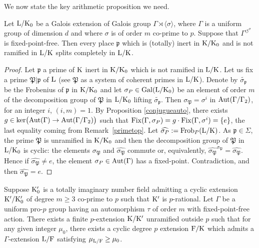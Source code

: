 \documentclass[12pt,a4paper,twoside,english]{smfart}
\def\K{{\rm K}}
\def\L{{\rm L}}
\def\F{{\rm F}}
\def\p{{\mathfrak p}}
\def\P{{\mathfrak P}}
\def\Gal{{\rm Gal}}
\def\Aut{{\rm Aut}}
\def\Frob{{\rm Frob}}
\def\Fix{{\rm Fix}}
\def\ker{{\rm ker}}
\def\act#1{{\displaystyle{#1^{\circlearrowleft^\sigma}}}}
\begin{document}
We now state the key arithmetic proposition we need.

\begin{prop}\label{splitting}
  Let $\L/\K_0$ be a Galois extension of Galois group $\Gamma \rtimes \langle \sigma \rangle$, where $\Gamma$ is a uniform group of dimension $d$ and where $\sigma$ is of order $m$ co-prime to $p$. %
  Suppose that $\act{\Gamma}$ is fixed-point-free. Then  every  place $\p$ which is (totally) inert in $\K/\K_0$ and is not ramified in $\L/\K$
  splits completely in $\L/\K$.
 \end{prop}

 \begin{proof}
  Let $\p$ a prime of $\K$ inert in $\K/\K_0$ which is not ramified in $\L/\K$. Let us fix a prime $\P|\p$ of $\L$ 
  (see $\P$ as a system of coherent primes in $\L/\K$). Denote by $\widetilde{\sigma_\p}$ be the Frobenius of $\p$ in $\K/\K_0$ and let $\sigma_\P \in \Gal(\L/\K_0)$ be
  an element of order $m$ of the decomposition group of $\P$ in $\L/\K_0$ lifting  $\widetilde{\sigma_\p}$.
  Then  $\sigma_{\P}= \sigma^i$ in $\Aut(\Gamma/\Gamma_2)$, for an integer $i$, $(i,m)=1$.
 By Proposition \ref{conjugueauto}, there exists $g\in \ker\big(\Aut(\Gamma)\rightarrow \Aut(\Gamma/\Gamma_2)\big)$ such that $\Fix(\Gamma,\sigma_\P)= g \cdot \Fix(\Gamma, \sigma^i)=\{e\}$, the last equality coming from Remark~\ref{primetop}.
  Let $\widehat{\sigma_\P}:=\Frob_\P(\L/\K)$. As $\p \in \Sigma$, the prime $\P$ is unramified in $\K/\K_0$ and then the decomposition group of $\P$ in $\L/\K_0$ is cyclic: 
  the elements $\sigma_\P$ and $\widehat{\sigma_\P}$ commute or, equivalently, $\widehat{\sigma_{\P}}^{\sigma_\P}=\widehat{\sigma_\P}$. Hence if $\widehat{\sigma_\P}\neq e $,
  the element $\sigma_{\P} \in \Aut(\Gamma)$
  has a fixed-point. Contradiction, and then  $\widehat{\sigma_\P}=e$.
 \end{proof}



\begin{theo}\label{main}
Suppose $\K_0'$ is a totally imaginary number field admitting 
 a cyclic extension $\K'/\K_0'$ of degree $m \geq 3$ co-prime to $p$ such that
 $\K'$ is $p$-rational.
Let $\Gamma$ be a uniform pro-$p$  group having an automorphism $\tau$ of order $m$ with fixed-point-free action. There exists  a finite $p$-extension $\K/\K'$ unramified outside $p$ such that for any given integer $\mu_0$, there exists a cyclic degree $p$ extension $\F/\K$ which admits a $\Gamma$-extension $\L/\F$ satisfying $\mu_{\L/\F}\geq \mu_0$.
\end{theo}
\end{document}
